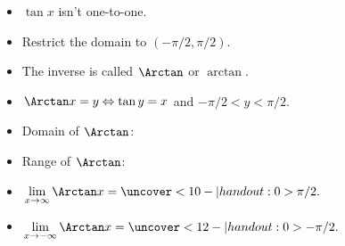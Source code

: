 \begin{frame}
\begin{columns}[c]
\ %
%
%
\begin{itemize}
\item<1->  $\tan x$ isn't one-to-one.
\item<2->  Restrict the domain to $(-\pi /2, \pi /2)$.
\item<3->  The inverse is called $\Arctan$ or $\arctan$.
\item<4->  $\Arctan x = y \Leftrightarrow \tan y = x$ and $-\pi /2 < y < \pi /2$.
\item<5->  \alert<handout:0| 5-6>{Domain of $\Arctan$: }
\item<5->  \alert<handout:0| 7-8>{Range of $\Arctan$: }
\item<9->  \alert<handout:0| 9-10>{$\displaystyle \lim_{x\rightarrow \infty} \Arctan x = \uncover<10-| handout:0>{\pi / 2.}$}
\item<9->  \alert<handout:0| 11-12>{$\displaystyle \lim_{x\rightarrow - \infty} \Arctan x = \uncover<12-| handout:0>{- \pi / 2.}$}
\end{itemize}
\end{columns}
\end{frame}
